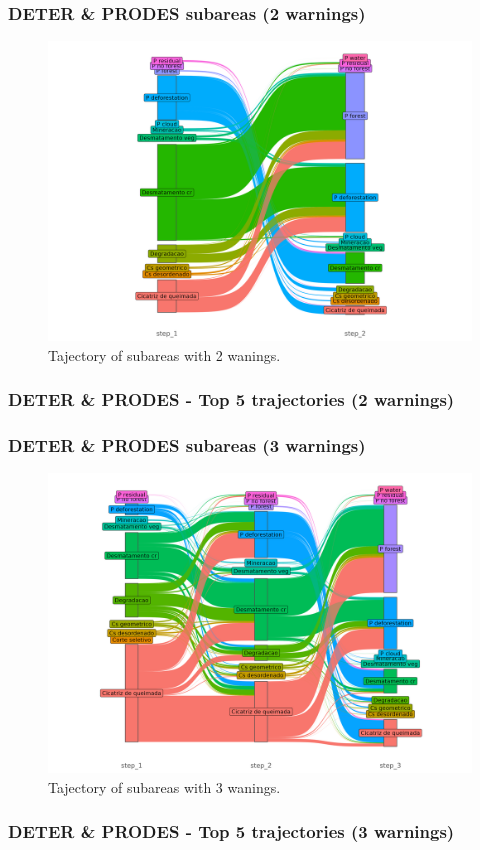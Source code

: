 \documentclass[aspectratio=169]{beamer}
\begin{document}
\begin{frame}
    \frametitle{DETER \& PRODES subareas (2 warnings)}
    \begin{figure}[h] 
        \includegraphics[width=0.65\linewidth]
        {./figures/plot_deter_prodes_subarea_trajectory_2.png}
        \caption{Tajectory of subareas with 2 wanings.}
        \label{fig:deter_prodes_subarea_trajectory_2}
    \end{figure}
\end{frame}

\begin{frame}[allowframebreaks]
    \frametitle{DETER \& PRODES - Top 5 trajectories (2 warnings)}
    
\end{frame}

\begin{frame}
    \frametitle{DETER \& PRODES subareas (3 warnings)}
    \begin{figure}[h] 
        \includegraphics[width=0.65\linewidth]
        {./figures/plot_deter_prodes_subarea_trajectory_3.png}
        \caption{Tajectory of subareas with 3 wanings.}
        \label{fig:deter_prodes_subarea_trajectory_3}
    \end{figure}
\end{frame}

\begin{frame}[allowframebreaks]
    \frametitle{DETER \& PRODES - Top 5 trajectories (3 warnings)}
    
\end{frame}
\end{document}
